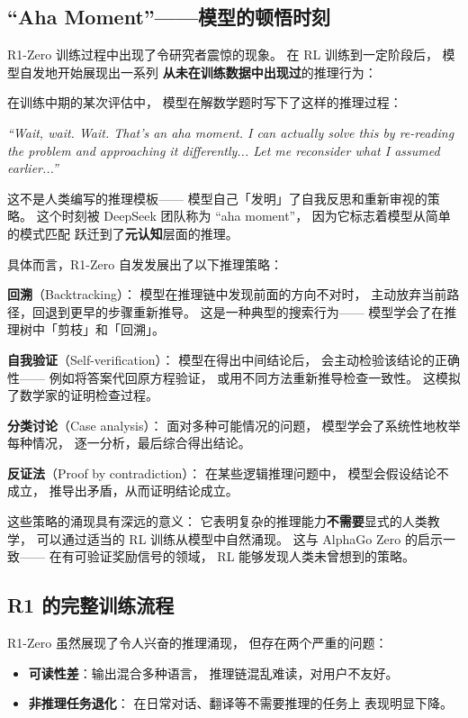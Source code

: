 \subsection{``Aha Moment''——模型的顿悟时刻}

R1-Zero 训练过程中出现了令研究者震惊的现象。
在 RL 训练到一定阶段后，
模型自发地开始展现出一系列
\textbf{从未在训练数据中出现过}的推理行为：

\begin{corebox}
在训练中期的某次评估中，
模型在解数学题时写下了这样的推理过程：

\textit{``Wait, wait. Wait. That's an aha moment.
I can actually solve this by re-reading the problem
and approaching it differently...
Let me reconsider what I assumed earlier...''}

这不是人类编写的推理模板——
模型自己「发明」了自我反思和重新审视的策略。
这个时刻被 DeepSeek 团队称为 ``aha moment''，
因为它标志着模型从简单的模式匹配
跃迁到了\textbf{元认知}层面的推理。
\end{corebox}

具体而言，R1-Zero 自发发展出了以下推理策略：

\textbf{回溯}（Backtracking）：
模型在推理链中发现前面的方向不对时，
主动放弃当前路径，回退到更早的步骤重新推导。
这是一种典型的搜索行为——
模型学会了在推理树中「剪枝」和「回溯」。

\textbf{自我验证}（Self-verification）：
模型在得出中间结论后，
会主动检验该结论的正确性——
例如将答案代回原方程验证，
或用不同方法重新推导检查一致性。
这模拟了数学家的证明检查过程。

\textbf{分类讨论}（Case analysis）：
面对多种可能情况的问题，
模型学会了系统性地枚举每种情况，
逐一分析，最后综合得出结论。

\textbf{反证法}（Proof by contradiction）：
在某些逻辑推理问题中，
模型会假设结论不成立，
推导出矛盾，从而证明结论成立。

这些策略的涌现具有深远的意义：
它表明复杂的推理能力\textbf{不需要}显式的人类教学，
可以通过适当的 RL 训练从模型中自然涌现。
这与 AlphaGo Zero 的启示一致——
在有可验证奖励信号的领域，
RL 能够发现人类未曾想到的策略。

\subsection{R1 的完整训练流程}

R1-Zero 虽然展现了令人兴奋的推理涌现，
但存在两个严重的问题：
\begin{itemize}[noitemsep]
  \item \textbf{可读性差}：输出混合多种语言，
        推理链混乱难读，对用户不友好。
  \item \textbf{非推理任务退化}：
        在日常对话、翻译等不需要推理的任务上
        表现明显下降。
\end{itemize}

